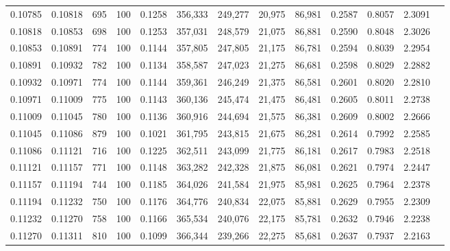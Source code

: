 \begin{tabular}{rrrrrrrrrrrrr}
0.10785 & 0.10818 &   695 & 100 &                                     0.1258 & 356,333 & 249,277 &  20,975 &  86,981 & 0.2587 & 0.8057 & 2.3091 \\
0.10818 & 0.10853 &   698 & 100 &                                     0.1253 & 357,031 & 248,579 &  21,075 &  86,881 & 0.2590 & 0.8048 & 2.3026 \\
0.10853 & 0.10891 &   774 & 100 &                                     0.1144 & 357,805 & 247,805 &  21,175 &  86,781 & 0.2594 & 0.8039 & 2.2954 \\
0.10891 & 0.10932 &   782 & 100 &                                     0.1134 & 358,587 & 247,023 &  21,275 &  86,681 & 0.2598 & 0.8029 & 2.2882 \\
0.10932 & 0.10971 &   774 & 100 &                                     0.1144 & 359,361 & 246,249 &  21,375 &  86,581 & 0.2601 & 0.8020 & 2.2810 \\
0.10971 & 0.11009 &   775 & 100 &                                     0.1143 & 360,136 & 245,474 &  21,475 &  86,481 & 0.2605 & 0.8011 & 2.2738 \\
0.11009 & 0.11045 &   780 & 100 &                                     0.1136 & 360,916 & 244,694 &  21,575 &  86,381 & 0.2609 & 0.8002 & 2.2666 \\
0.11045 & 0.11086 &   879 & 100 &                                     0.1021 & 361,795 & 243,815 &  21,675 &  86,281 & 0.2614 & 0.7992 & 2.2585 \\
0.11086 & 0.11121 &   716 & 100 &                                     0.1225 & 362,511 & 243,099 &  21,775 &  86,181 & 0.2617 & 0.7983 & 2.2518 \\
0.11121 & 0.11157 &   771 & 100 &                                     0.1148 & 363,282 & 242,328 &  21,875 &  86,081 & 0.2621 & 0.7974 & 2.2447 \\
0.11157 & 0.11194 &   744 & 100 &                                     0.1185 & 364,026 & 241,584 &  21,975 &  85,981 & 0.2625 & 0.7964 & 2.2378 \\
0.11194 & 0.11232 &   750 & 100 &                                     0.1176 & 364,776 & 240,834 &  22,075 &  85,881 & 0.2629 & 0.7955 & 2.2309 \\
0.11232 & 0.11270 &   758 & 100 &                                     0.1166 & 365,534 & 240,076 &  22,175 &  85,781 & 0.2632 & 0.7946 & 2.2238 \\
0.11270 & 0.11311 &   810 & 100 &                                     0.1099 & 366,344 & 239,266 &  22,275 &  85,681 & 0.2637 & 0.7937 & 2.2163 \\

\end{tabular}
